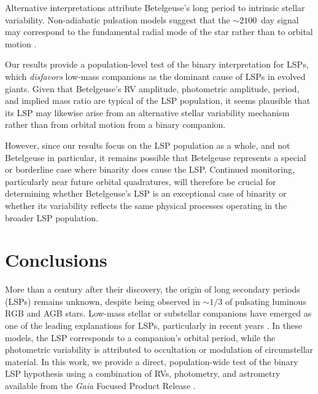 \documentclass[trackchanges,twocolumn]{aastex631}
\begin{document}
Alternative interpretations attribute Betelgeuse’s long period to intrinsic stellar variability. Non-adiabatic pulsation models suggest that the $\sim2100$~day signal may correspond to the fundamental radial mode of the star rather than to orbital motion \citep{Saio23}. 

Our results provide a population-level test of the binary interpretation for LSPs, which {\it disfavors} low-mass companions as the dominant cause of LSPs in evolved giants. Given that Betelgeuse’s RV amplitude, photometric amplitude, period, and implied mass ratio are typical of the LSP population, it seems plausible that its LSP may likewise arise from an alternative stellar variability mechanism rather than from orbital motion from a binary companion. 

However, since our results focus on the LSP population as a whole, and not Betelgeuse in particular, it remains possible that Betelgeuse represents a special or borderline case where binarity does cause the LSP.
Continued monitoring, particularly near future orbital quadratures, will therefore be crucial for determining whether Betelgeuse's LSP is an exceptional case of binarity or whether its variability reflects the same physical processes operating in the broader LSP population.


\section{Conclusions}\label{sec:conclusions}

More than a century after their discovery, the origin of long secondary periods (LSPs) remains unknown, despite being observed in $\sim1/3$ of pulsating luminous RGB and AGB stars. 
Low-mass stellar or substellar companions have emerged as one of the leading explanations for LSPs, particularly in recent years \citep[e.g.,][]{Soszynski21,Goldberg24,MacLeod25,Decin25}. In these models, the LSP corresponds to a companion's orbital period, while the photometric variability is attributed to occultation or modulation of circumstellar material. In this work, we provide a direct, population-wide test of the binary LSP hypothesis using a combination of RVs, photometry, and astrometry available from the {\it Gaia} Focused Product Release \citep{Gaia_FPR}.
\end{document}
